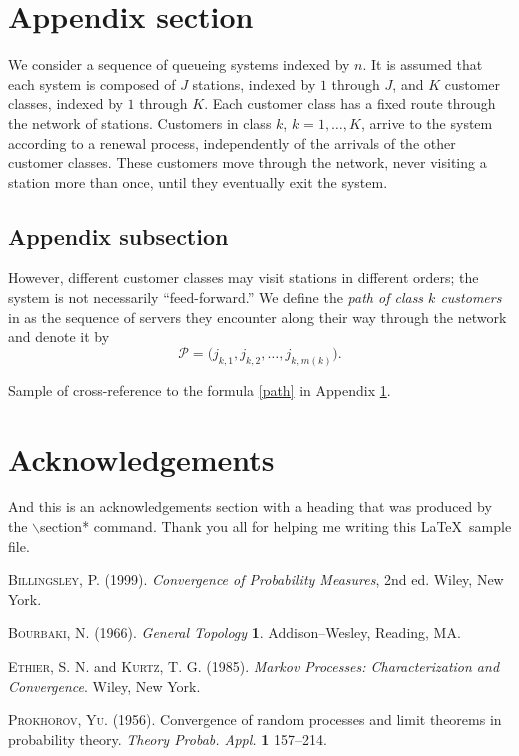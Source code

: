 \documentclass[joc]{ipart}
\theoremstyle{plain}
\begin{document}
\appendix

\section{Appendix section}\label{app}

We consider a sequence of queueing systems
indexed by $n$.  It is assumed that each system
is composed of $J$ stations, indexed by $1$
through $J$, and $K$ customer classes, indexed
by $1$ through $K$.  Each customer class
has a fixed route through the network of
stations.  Customers in class
$k$, $k=1,\ldots,K$, arrive to the
system according to a
renewal process, independently of the arrivals
of the other customer classes.  These customers
move through the network, never visiting a station
more than once, until they eventually exit
the system.

\subsection{Appendix subsection}

However, different customer classes may visit
stations in different orders; the system
is not necessarily ``feed-forward.''
We define the {\em path of class $k$ customers} in
as the sequence of servers
they encounter along their way through the network
and denote it by
\begin{equation}
\mathcal{P}=\bigl(j_{k,1},j_{k,2},\dots,j_{k,m(k)}\bigr). \label{path}
\end{equation}

Sample of cross-reference to the formula \ref{path} in Appendix \ref{app}.

\section*{Acknowledgements}
And this is an acknowledgements section with a heading that was produced by the
$\backslash$section* command. Thank you all for helping me writing this
\LaTeX\ sample file.

\begin{thebibliography}{9}

\textsc{Billingsley, P.} (1999). \textit{Convergence of
Probability Measures}, 2nd ed.
Wiley, New York.


\textsc{Bourbaki, N.}  (1966). \textit{General Topology}  \textbf{1}.
Addison--Wesley, Reading, MA.

\textsc{Ethier, S. N.} and \textsc{Kurtz, T. G.} (1985).
\textit{Markov Processes: Characterization and Convergence}.
Wiley, New York.

\textsc{Prokhorov, Yu.} (1956).
Convergence of random processes and limit theorems in probability
theory. \textit{Theory  Probab.  Appl.}
\textbf{1} 157--214.

\end{thebibliography}
\end{document}
